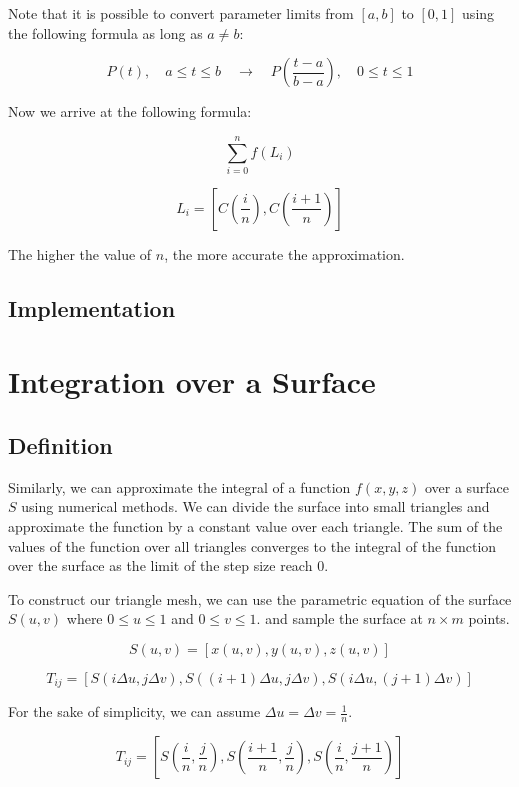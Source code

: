 \documentclass[12pt]{article}
\begin{document}
Note that it is possible to convert parameter limits from \([a, b]\) to \([0, 1]\) using the following formula as long as \(a \neq b\):

\[
    P(t), \quad a \leq t \leq b \quad \rightarrow \quad P\left(\frac{t - a}{b - a}\right), \quad 0 \leq t \leq 1
\]

Now we arrive at the following formula:

\[
    \sum_{i=0}^{n} f\left(L_i\right)
\]

\[
    L_i = \left[C\left(\frac{i}{n}\right), C\left(\frac{i + 1}{n}\right)\right]
\]

The higher the value of \(n\), the more accurate the approximation.

\subsection{Implementation}

\newpage
\section{Integration over a Surface}

\subsection{Definition}

Similarly, we can approximate the integral of a function \(f(x, y, z)\) over a surface \(S\) using numerical methods.
We can divide the surface into small triangles and approximate the function by a constant value over each triangle.
The sum of the values of the function over all triangles converges to the integral of the function over the surface
as the limit of the step size reach 0.

To construct our triangle mesh, we can use the parametric equation of the surface \(S(u, v)\) where \(0 \leq u \leq 1\) and \(0 \leq v \leq 1\).
and sample the surface at \(n \times m\) points.

\[
    S(u, v) = \left[x(u, v), y(u, v), z(u, v)\right]
\]

\[
    T_{ij} = \left[S\left(i \Delta u, j \Delta v\right), S\left((i + 1)\Delta u, j \Delta v\right), S\left(i \Delta u, (j + 1) \Delta v\right)\right]
\]

For the sake of simplicity, we can assume \(\Delta u = \Delta v = \frac{1}{n}\).

\[
    T_{ij} = \left[S\left(\frac{i}{n}, \frac{j}{n}\right), S\left(\frac{i + 1}{n}, \frac{j}{n}\right), S\left(\frac{i}{n}, \frac{j + 1}{n}\right)\right]
\]
\end{document}
